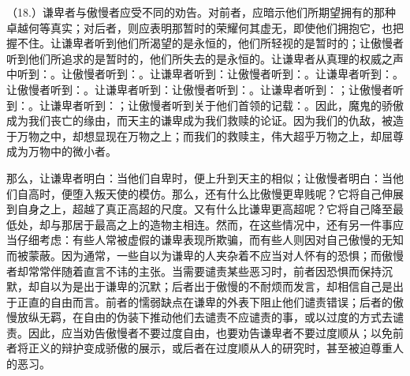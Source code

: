 （18.）谦卑者与傲慢者应受不同的劝告。对前者，应暗示他们所期望拥有的那种卓越何等真实；对后者，则应表明那暂时的荣耀何其虚无，即使他们拥抱它，也把握不住。让谦卑者听到他们所渴望的是永恒的，他们所轻视的是暂时的；让傲慢者听到他们所追求的是暂时的，他们所失去的是永恒的。让谦卑者从真理的权威之声中听到：\newline{}。让傲慢者听到：\newline{}。让谦卑者听到：\newline{}让傲慢者听到：\newline{}。让谦卑者听到：\newline{}。让傲慢者听到：\newline{}。让谦卑者听到：\newline{}让傲慢者听到：\newline{}。让谦卑者听到：\newline{}；让傲慢者听到：\newline{}。让谦卑者听到：\newline{}；让傲慢者听到关于他们首领的记载：\newline{}。因此，魔鬼的骄傲成为我们丧亡的缘由，而天主的谦卑成为我们救赎的论证。因为我们的仇敌，被造于万物之中，却想显现在万物之上；而我们的救赎主，伟大超乎万物之上，却屈尊成为万物中的微小者。\par

那么，让谦卑者明白：当他们自卑时，便上升到天主的相似；让傲慢者明白：当他们自高时，便堕入叛天使的模仿。那么，还有什么比傲慢更卑贱呢？它将自己伸展到自身之上，超越了真正高超的尺度。又有什么比谦卑更高超呢？它将自己降至最低处，却与那居于最高之上的造物主相连。然而，在这些情况中，还有另一件事应当仔细考虑：有些人常被虚假的谦卑表现所欺骗，而有些人则因对自己傲慢的无知而被蒙蔽。因为通常，一些自以为谦卑的人夹杂着不应当对人怀有的恐惧；而傲慢者却常常伴随着直言不讳的主张。当需要谴责某些恶习时，前者因恐惧而保持沉默，却自以为是出于谦卑的沉默；后者出于傲慢的不耐烦而发言，却相信自己是出于正直的自由而言。前者的懦弱缺点在谦卑的外表下阻止他们谴责错误；后者的傲慢放纵无羁，在自由的伪装下推动他们去谴责不应谴责的事，或以过度的方式去谴责。因此，应当劝告傲慢者不要过度自由，也要劝告谦卑者不要过度顺从；以免前者将正义的辩护变成骄傲的展示，或后者在过度顺从人的研究时，甚至被迫尊重人的恶习。\par

